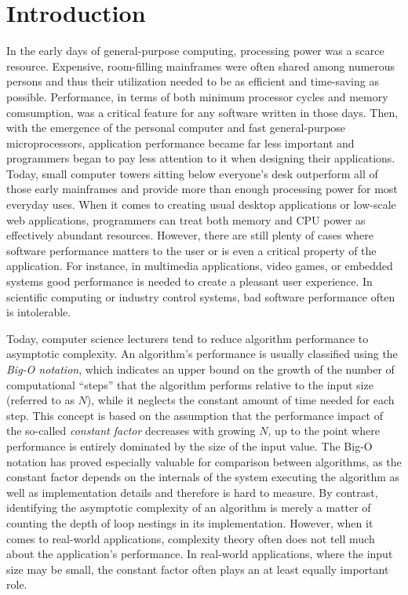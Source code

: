 \section{Introduction}
In the early days of general-purpose computing, processing power was a scarce resource. Expensive, room-filling mainframes were often shared among numerous persons and thus their utilization needed to be as efficient and time-saving as possible.   Performance, in terms of both minimum processor cycles and memory comsumption, was a critical feature for any software written in those days. Then, with the emergence of the personal computer and fast general-purpose microprocessors, application performance became far less important and programmers began to pay less attention to it when designing their applications. Today, small computer towers sitting below everyone's desk outperform all of those early mainframes and provide more than enough processing power for most everyday uses. When it comes to creating usual desktop applications or low-scale web applications, programmers can treat both memory and CPU power as effectively abundant resources. However, there are still plenty of cases where software performance matters to the user or is even a critical property of the application. For instance, in multimedia applications, video games, or embedded systems good performance is needed to create a pleasant user experience. In scientific computing or industry control systems, bad software performance often is intolerable.

Today, computer science lecturers tend to reduce algorithm performance to asymptotic complexity. An algorithm's performance is usually classified using the \emph{Big-O notation}, which indicates an upper bound on the growth of the number of computational ``steps'' that the algorithm performs relative to the input size (referred to as $N$), while it neglects the constant amount of time needed for each step. This concept is based on the assumption that the performance impact of the so-called \emph{constant factor} decreases with growing $N$, up to the point where performance is entirely dominated by the size of the input value. The Big-O notation has proved especially valuable for comparison between algorithms, as the constant factor depends on the internals of the system executing the algorithm as well as implementation details and therefore is hard to measure. By contrast, identifying the asymptotic complexity of an algorithm is merely a matter of counting the depth of loop nestings in its implementation. However, when it comes to real-world applications, complexity theory often does not tell much about the application's performance. In real-world applications, where the input size may be small, the constant factor often plays an at least equally important role.

